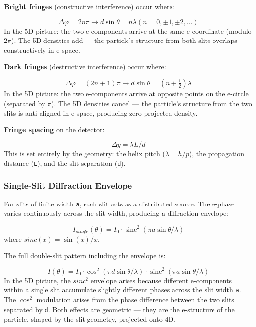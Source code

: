 \documentclass[aps,prd,preprint,superscriptaddress,longbibliography,floatfix]{revtex4-2}
\theoremstyle{remark}
\begin{document}
\textbf{Bright fringes} (constructive interference) occur where:


\begin{equation}
    \Delta\varphi = 2n\pi    \to    d \sin \theta = n\lambda    (n = 0, \pm1, \pm2, ...)
\end{equation}
In the 5D picture: the two e-components arrive at the same e-coordinate (modulo $2\pi$). The 5D densities add --- the particle's structure from both slits overlaps constructively in e-space.

\textbf{Dark fringes} (destructive interference) occur where:


\begin{equation}
    \Delta\varphi = (2n+1)\pi    \to    d \sin \theta = (n + \tfrac{1}{2})\lambda
\end{equation}
In the 5D picture: the two e-components arrive at opposite points on the e-circle (separated by $\pi$). The 5D densities cancel --- the particle's structure from the two slits is anti-aligned in e-space, producing zero projected density.

\textbf{Fringe spacing} on the detector:


\begin{equation}
    \Delta y = \lambda L/d
\end{equation}
This is set entirely by the geometry: the helix pitch ($\lambda = h/p$), the propagation distance (\texttt{L}), and the slit separation (\texttt{d}).


\subsubsection{Single-Slit Diffraction Envelope}

For slits of finite width \texttt{a}, each slit acts as a distributed source. The e-phase varies continuously across the slit width, producing a diffraction envelope:


\begin{equation}
    I_{single}(\theta) = I_{0} \cdot \operatorname{sinc}^2(\pi a \sin \theta / \lambda)
\end{equation}
where $sinc(x) = \sin(x)/x$.

The full double-slit pattern including the envelope is:


\begin{equation}
    I(\theta) = I_{0} \cdot \cos^2(\pi d \sin \theta / \lambda) \cdot \operatorname{sinc}^2(\pi a \sin \theta / \lambda)
\end{equation}
In the 5D picture, the $sinc^{2}$ envelope arises because different e-components within a single slit accumulate slightly different phases across the slit width \texttt{a}. The $\cos^{2}$ modulation arises from the phase difference between the two slits separated by \texttt{d}. Both effects are geometric --- they are the e-structure of the particle, shaped by the slit geometry, projected onto 4D.
\end{document}
